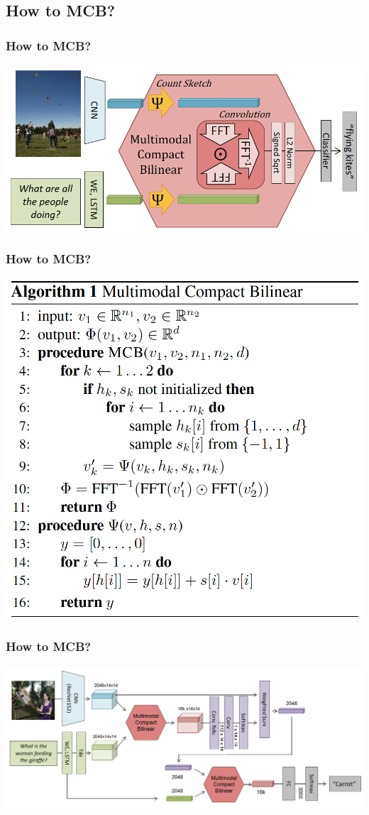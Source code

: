 \documentclass{beamer}
\begin{document}
\subsection{How to MCB?}
\begin{frame}
\frametitle{How to MCB?}
\begin{center}
\includegraphics[scale=0.5]{./images/How_to_MCB01}
\end{center}
\end{frame}
\begin{frame}
\frametitle{How to MCB?}
\begin{center}
\includegraphics[scale=0.45]{./images/How_to_MCB02}
\end{center}
\end{frame}
\begin{frame}
\frametitle{How to MCB?}
\begin{center}
\includegraphics[scale=0.45]{./images/How_to_MCB03}
\end{center}
\end{frame}
\end{document}
